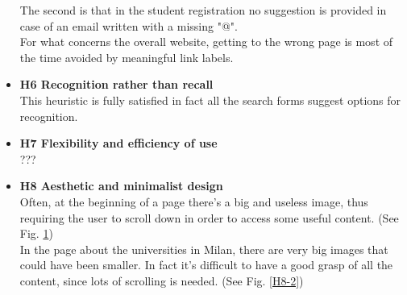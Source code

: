 \begin{itemize}
        The second is that in the student registration no suggestion is provided in case of an email written with a missing "@".\\        
        For what concerns the overall website, getting to the wrong page is most of the time avoided by meaningful link labels.
    \item \textbf{H6 Recognition rather than recall}\\
        This heuristic is fully satisfied in fact all the search forms suggest options for recognition.
    \item \textbf{H7 Flexibility and efficiency of use}\\
        ???
    \item \textbf{H8 Aesthetic and minimalist design}\\
        Often, at the beginning of a page there's a big and useless image, thus requiring the user to scroll down in order to access some useful content. (See Fig. \ref{H8-1})\\
        In the page about the universities in Milan, there are very big images that could have been smaller. In fact it's difficult to have a good grasp of all the content, since lots of scrolling is needed. (See Fig. \ref{H8-2})
        \begin{figure}[!ht]
            \begin{minipage}{\linewidth}
                \centering
                \captionsetup{justification=centering}
                \caption{}
                \label{H8-1}
            \end{minipage}
        \end{figure}
        \begin{figure}[!ht]
            \begin{minipage}{\linewidth}
                \centering

\end{minipage}
\end{figure}
\end{itemize}
